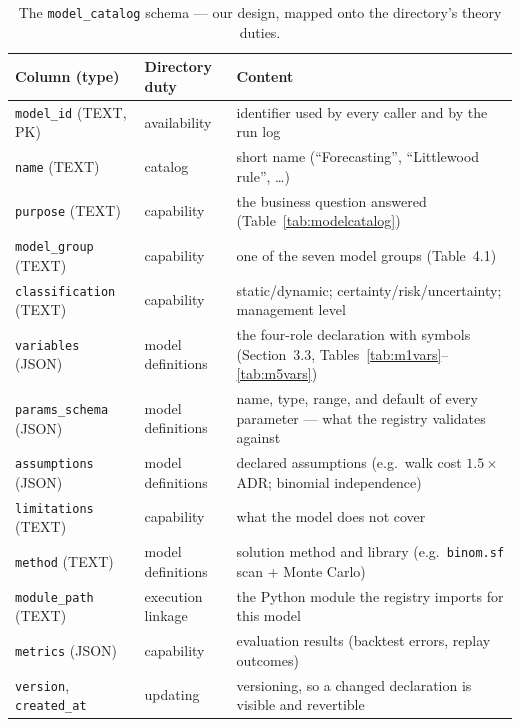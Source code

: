 \begin{table}[H]
\centering
\caption{The \texttt{model\_catalog} schema --- our design, mapped onto the directory's theory duties.}
\label{tab:catalogschema}
\begin{tabularx}{\textwidth}{@{}l l X@{}}
\toprule
\textbf{Column (type)} & \textbf{Directory duty} & \textbf{Content} \\
\midrule
\texttt{model\_id} (TEXT, PK) & availability & identifier used by every caller and by the run log \\
\texttt{name} (TEXT) & catalog & short name (``Forecasting'', ``Littlewood rule'', \ldots) \\
\texttt{purpose} (TEXT) & capability & the business question answered (Table~\ref{tab:modelcatalog}) \\
\texttt{model\_group} (TEXT) & capability & one of the seven model groups (Table~4.1) \\
\texttt{classification} (TEXT) & capability & static/dynamic; certainty/risk/uncertainty; management level \\
\texttt{variables} (JSON) & model definitions & the four-role declaration with symbols (Section~3.3, Tables~\ref{tab:m1vars}--\ref{tab:m5vars}) \\
\texttt{params\_schema} (JSON) & model definitions & name, type, range, and default of every parameter --- what the registry validates against \\
\texttt{assumptions} (JSON) & model definitions & declared assumptions (e.g.\ walk cost $1.5\times$ ADR; binomial independence) \\
\texttt{limitations} (TEXT) & capability & what the model does not cover \\
\texttt{method} (TEXT) & model definitions & solution method and library (e.g.\ \texttt{binom.sf} scan + Monte Carlo) \\
\texttt{module\_path} (TEXT) & execution linkage & the Python module the registry imports for this model \\
\texttt{metrics} (JSON) & capability & evaluation results (backtest errors, replay outcomes) \\
\texttt{version}, \texttt{created\_at} & updating & versioning, so a changed declaration is visible and revertible \\
\bottomrule
\end{tabularx}
\end{table}

